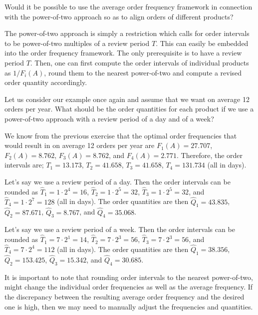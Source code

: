 \begin{exercise}
Would it be possible to use the average order frequency framework in connection with the power-of-two approach so as to align orders of different products?


\begin{solution}
The power-of-two approach is simply a restriction which calls for order intervals to be power-of-two multiples of a review period $T$. This can easily be embedded into the order frequency framework. The only prerequisite is to have a review period $T$. Then, one can first compute the order intervals of individual products as $1/F_i(A)$, round them to the nearest power-of-two and compute a revised order quantity accordingly. 
\end{solution}
\end{exercise}


\begin{exercise}
Let us consider our example once again and assume that we want on average 12 orders per year. What should be the order quantities for each product if we use a power-of-two approach with a review period of a day and of a week? 


\begin{solution}
We know from the previous exercise that the optimal order frequencies that would result in on average 12 orders per year are $F_1(A)=27.707$, $F_2(A)=8.762$, $F_3(A)=8.762$, and $F_4(A)=2.771$. Therefore, the order intervals are; $T_1=13.173$, $T_2=41.658$, $T_3=41.658$, $T_4=131.734$ (all in days). 

Let's say we use a review period of a day. Then the order intervals can be rounded as $\hat{T}_1=1\cdot 2^4=16$, $\hat{T}_2=1\cdot 2^5=32$, $\hat{T}_3=1\cdot 2^5=32$, and $\hat{T}_4=1\cdot 2^7=128$ (all in days). The order quantities are then $\hat{Q}_1=43.835$, $\hat{Q}_2=87.671$, $\hat{Q}_3=8.767$, and $\hat{Q}_4=35.068$.

Let's say we use a review period of a week. Then the order intervals can be rounded as $\hat{T}_1=7\cdot 2^1=14$, $\hat{T}_2=7\cdot 2^3=56$, $\hat{T}_3=7\cdot 2^3=56$, and $\hat{T}_4=7\cdot 2^4=112$ (all in days). The order quantities are then $\hat{Q}_1=38.356$, $\hat{Q}_2=153.425$, $\hat{Q}_3=15.342$, and $\hat{Q}_4=30.685$.

It is important to note that rounding order intervals to the nearest power-of-two, might change the individual order frequencies as well as the average frequency. If the discrepancy between the resulting average order frequency and the desired one is high, then we may need to manually adjust the frequencies and quantities.
\end{solution}
\end{exercise}

